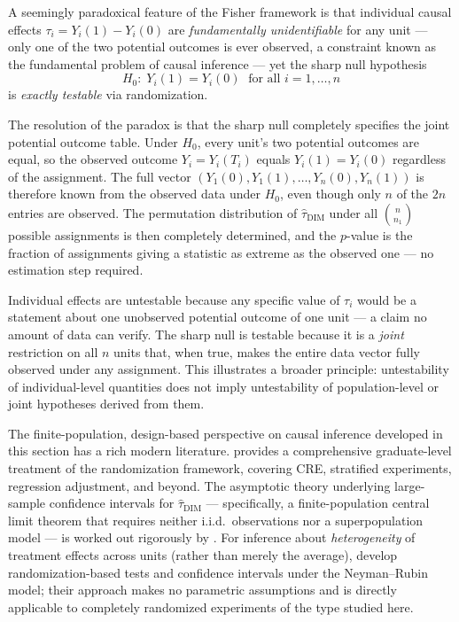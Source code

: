 \documentclass[master.tex]{subfiles}
\begin{document}
\begin{remark}
\label{w5:rem:sharp-null}
A seemingly paradoxical feature of the Fisher framework is that
individual causal effects $\tau_i = Y_i(1) - Y_i(0)$ are
\emph{fundamentally unidentifiable} for any unit --- only one of the
two potential outcomes is ever observed, a constraint known as the
fundamental problem of causal inference --- yet the sharp null
hypothesis
\[
  H_0:\; Y_i(1) = Y_i(0) \;\text{ for all } i = 1,\ldots,n
\]
is \emph{exactly testable} via randomization.

The resolution of the paradox is that the sharp null completely
specifies the joint potential outcome table.  Under $H_0$, every unit's
two potential outcomes are equal, so the observed outcome $Y_i =
Y_i(T_i)$ equals $Y_i(1) = Y_i(0)$ regardless of the assignment.  The
full vector $(Y_1(0), Y_1(1), \ldots, Y_n(0), Y_n(1))$ is therefore
known from the observed data under $H_0$, even though only $n$ of the
$2n$ entries are observed.  The permutation distribution of
$\hat\tau_{\mathrm{DIM}}$ under all $\binom{n}{n_1}$ possible
assignments is then completely determined, and the $p$-value is the
fraction of assignments giving a statistic as extreme as the observed
one --- no estimation step required.

Individual effects are untestable because any specific value of
$\tau_i$ would be a statement about one unobserved potential outcome
of one unit --- a claim no amount of data can verify.  The sharp null
is testable because it is a \emph{joint} restriction on all $n$ units
that, when true, makes the entire data vector fully observed under any
assignment.  This illustrates a broader principle: untestability of
individual-level quantities does not imply untestability of
population-level or joint hypotheses derived from them.
\end{remark}


\begin{remark}
\label{w5:rem:randomization-reading}
The finite-population, design-based perspective on causal inference
developed in this section has a rich modern literature.
\citet{ding2023first} provides a comprehensive graduate-level treatment
of the randomization framework, covering CRE, stratified experiments,
regression adjustment, and beyond.
The asymptotic theory underlying large-sample confidence intervals for
$\hat\tau_{\mathrm{DIM}}$ --- specifically, a finite-population central
limit theorem that requires neither i.i.d.\ observations nor a
superpopulation model --- is worked out rigorously by
\citet{li2017general}.
For inference about \emph{heterogeneity} of treatment effects across
units (rather than merely the average), \citet{ding2016randomization}
develop randomization-based tests and confidence intervals under the
Neyman--Rubin model; their approach makes no parametric assumptions and
is directly applicable to completely randomized experiments of the type
studied here.
\end{remark}
\end{document}
